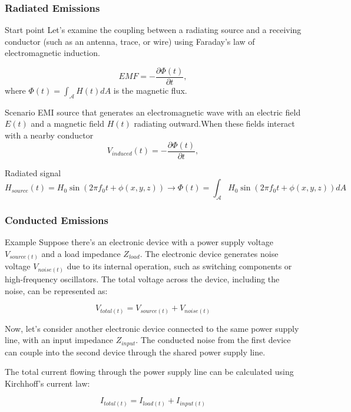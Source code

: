 \documentclass[10pt,hyperref={pdfpagemode=FullScreen},aspectratio=169]{beamer}
\begin{document}
\begin{frame}
  \frametitle{Radiated Emissions }

  \begin{block}{Start point}
    Let's examine the coupling between a radiating source and a receiving conductor (such as an antenna, trace, or wire) using Faraday's law of electromagnetic induction.
  \end{block}

  $$
  EMF = - \frac{\partial \Phi(t)}{\partial t},
  $$
  where $\Phi(t) = \int _{\mathcal{A}} H(t) dA $ is the magnetic flux.

  \begin{block}{Scenario}
    EMI source that generates an electromagnetic wave with an electric field $E(t)$ and a magnetic field $H(t)$ radiating outward.When these fields interact with a nearby conductor
    $$
    V_{induced}(t) = - \frac{\partial \Phi(t)}{\partial t},
    $$
  \end{block}
  \begin{block}{Radiated signal}
    $$
    H_{source}(t) = H_0 \sin {(2 \pi f_0 t + \phi(x,y,z) )} \rightarrow \Phi(t) = \int _{\mathcal{A}} H_0 \sin {(2 \pi f_0 t + \phi(x,y,z))} dA  
    $$    
  \end{block}
\end{frame}





\begin{frame}
    \frametitle{Conducted Emissions}
  \begin{block}{Example}
    Suppose there's an electronic device with a power supply voltage $V_{source(t)}$ and a load impedance $Z_{load}$. The electronic device generates noise voltage $V_{noise(t)}$ due to its internal operation, such as switching components or high-frequency oscillators. The total voltage across the device, including the noise, can be represented as:

$$V_{total(t)} = V_{source(t)} + V_{noise(t)}$$

Now, let's consider another electronic device connected to the same power supply line, with an input impedance $Z_{input}$. The conducted noise from the first device can couple into the second device through the shared power supply line.

The total current flowing through the power supply line can be calculated using Kirchhoff's current law:

$$I_{total(t)} = I_{load(t)} + I_{input(t)}$$
  \end{block}
\end{frame}
\end{document}
